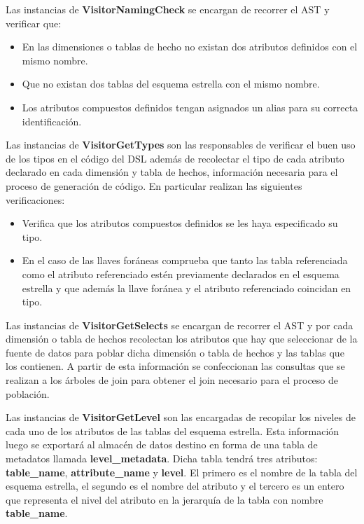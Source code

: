 Las instancias de \textbf{VisitorNamingCheck} se encargan de recorrer el AST y verificar que: 

\begin{itemize}
    \item En las dimensiones o tablas de hecho no existan dos atributos definidos con el mismo nombre.
    \item Que no existan dos tablas del esquema estrella con el mismo nombre.
    \item Los atributos compuestos definidos tengan asignados un alias para su correcta identificación.
\end{itemize}

Las instancias de \textbf{VisitorGetTypes} son las responsables de verificar el buen uso de los tipos en el 
código del DSL además de recolectar el tipo de cada atributo declarado en cada dimensión y 
tabla de hechos, 
información necesaria para el proceso de generación de código. En particular realizan 
las siguientes verificaciones: 

\begin{itemize}
    \item Verifica que los atributos compuestos definidos se les haya especificado su tipo.
    \item En el caso de las llaves for\'aneas comprueba que tanto las tabla referenciada como el atributo 
        referenciado est\'en previamente declarados en el esquema estrella y que además la llave for\'anea 
        y el atributo referenciado coincidan en tipo.
\end{itemize}

Las instancias de \textbf{VisitorGetSelects} se encargan de recorrer el AST y por cada dimensión o tabla 
de hechos recolectan los atributos que hay que seleccionar de la fuente de datos 
para poblar dicha dimensión o tabla de hechos y las tablas que los contienen. A partir de esta información se confeccionan las consultas 
que se realizan a los \'arboles de join para obtener el join necesario para el proceso de población.

Las instancias de \textbf{VisitorGetLevel} son las encargadas de recopilar los niveles de cada uno de los 
atributos de las tablas del esquema estrella. Esta información luego se exportar\'a al almacén de datos 
destino en forma de una tabla de metadatos llamada \textbf{level\_metadata}. Dicha tabla tendrá tres atributos: 
\textbf{table\_name}, \textbf{attribute\_name} y \textbf{level}. El primero es el nombre de la tabla del esquema 
estrella, el segundo es el nombre del atributo y el tercero es un entero que representa el nivel del atributo 
en la jerarquía de la tabla con nombre \textbf{table\_name}.

